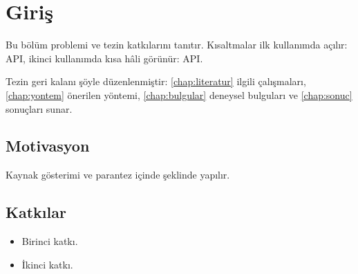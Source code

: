 \chapter{Giriş}
\label{chap:giris}

Bu bölüm problemi ve tezin katkılarını tanıtır. Kısaltmalar ilk kullanımda
açılır: \ac{API}, ikinci kullanımda kısa hâli görünür: \ac{API}.

Tezin geri kalanı şöyle düzenlenmiştir: \cref{chap:literatur} ilgili
çalışmaları, \cref{chap:yontem} önerilen yöntemi, \cref{chap:bulgular}
deneysel bulguları ve \cref{chap:sonuc} sonuçları sunar.

\section{Motivasyon}
\label{sec:motivasyon}

Kaynak gösterimi \textcite{knuth1984texbook} ve parantez içinde
\parencite{lamport1994latex} şeklinde yapılır.

\section{Katkılar}
\label{sec:katkilar}

\begin{itemize}
  \item Birinci katkı.
  \item İkinci katkı.
\end{itemize}
